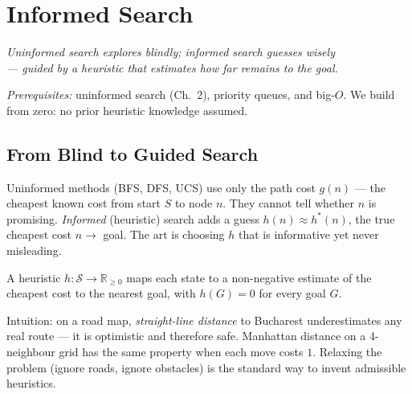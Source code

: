 \chapter{Informed Search}\label{ch:informed}
\begin{center}\small\textit{Uninformed search explores blindly; informed search guesses wisely\\--- guided by a heuristic that estimates how far remains to the goal.}\end{center}

\noindent{}
\vspace{0.3em}

\noindent\textit{Prerequisites:} uninformed search (Ch.~2), priority queues, and big-$O$. We build from zero: no prior heuristic knowledge assumed.


\section{From Blind to Guided Search}
Uninformed methods (\textsc{BFS}, \textsc{DFS}, UCS) use only the path cost $g(n)$ --- the cheapest known cost from start $S$ to node $n$. They cannot tell whether $n$ is promising. \emph{Informed} (heuristic) search adds a guess $h(n)\approx h^{*}(n)$, the true cheapest cost $n\to$ goal. The art is choosing $h$ that is informative yet never misleading.

\begin{definition}
A heuristic $h:\mathcal{S}\to\mathbb{R}_{\ge 0}$ maps each state to a non-negative estimate of the cheapest cost to the nearest goal, with $h(G)=0$ for every goal $G$.
\end{definition}

Intuition: on a road map, \emph{straight-line distance} to Bucharest underestimates any real route --- it is optimistic and therefore safe. Manhattan distance on a 4-neighbour grid has the same property when each move costs $1$. Relaxing the problem (ignore roads, ignore obstacles) is the standard way to invent admissible heuristics.

